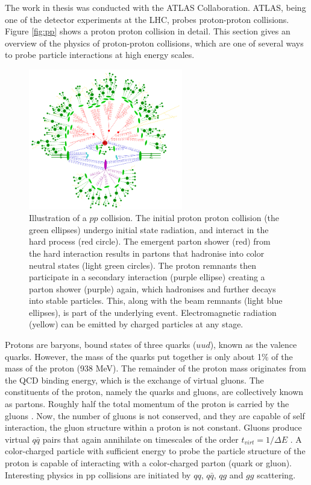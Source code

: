 \documentclass[11pt,a4paper,openright,twoside]{report}
\begin{document}
The work in thesis was conducted with the ATLAS Collaboration. ATLAS, being one of the detector experiments at the LHC, probes proton-proton collisions. Figure \ref{fig:pp} shows a proton proton collision in detail. This section gives an overview of the physics of proton-proton collisions, which are one of several ways to probe particle interactions at high energy scales.

\begin{figure}
\centering
\includegraphics[width=0.6\textwidth]{pp-shower.png}
\caption{Illustration of a $pp$ collision. The initial proton proton collision (the green ellipses) undergo initial state radiation, and interact in the hard process (red circle). The emergent parton shower (red) from the hard interaction results in partons that hadronise into color neutral states (light green circles). The proton remnants then participate in a secondary interaction (purple ellipse) creating a parton shower (purple) again, which hadronises and further decays into stable particles. This, along with the beam remnants (light blue ellipses), is part of the underlying event. Electromagnetic radiation (yellow) can be emitted by charged particles at any stage.}
\end{figure}

Protons are baryons, bound states of three quarks ($uud$), known as the valence quarks.  However, the mass of the quarks put together is only about 1\% of the mass of the proton (938 MeV). The remainder of the proton mass originates from the QCD binding energy, which is the exchange of virtual gluons. The constituents of the proton, namely the quarks and gluons, are collectively known as partons. Roughly half the total momentum of the proton is carried by the gluons \cite{quarks_and_leptons}. Now, the number of gluons is not conserved, and they are capable of self interaction, the gluon structure within a proton is not constant. Gluons produce virtual $q\bar{q}$ pairs that again annihilate on timescales of the order $t_{virt}=1/\Delta E$ \cite{collider_physics}. A color-charged particle with sufficient energy to probe the particle structure of the proton is capable of interacting with a color-charged parton (quark or gluon). Interesting physics in pp collisions are initiated by $qq$, $q\bar{q}$, $qg$ and $gg$ scattering.
\end{document}
